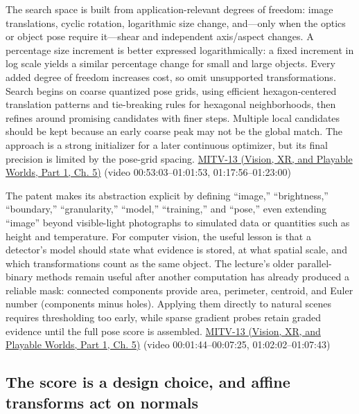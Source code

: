 The search space is built from application-relevant degrees of freedom: image translations, cyclic rotation, logarithmic size change, and---only when the optics or object pose require it---shear and independent axis/aspect changes. A percentage size increment is better expressed logarithmically: a fixed increment in log scale yields a similar percentage change for small and large objects. Every added degree of freedom increases cost, so omit unsupported transformations. Search begins on coarse quantized pose grids, using efficient hexagon-centered translation patterns and tie-breaking rules for hexagonal neighborhoods, then refines around promising candidates with finer steps. Multiple local candidates should be kept because an early coarse peak may not be the global match. The approach is a strong initializer for a later continuous optimizer, but its final precision is limited by the pose-grid spacing. \href{../07-Vision-XR-and-Playable-Worlds-P01/main.pdf\#nameddest=04-visual-computing-ii-ch036-mitv-13---object-detection-recognition-and-pose-determination-patquick-us-7016539}{MITV-13 (Vision, XR, and Playable Worlds, Part 1, Ch. 5)} (video 00:53:03--01:01:53, 01:17:56--01:23:00)

The patent makes its abstraction explicit by defining ``image,'' ``brightness,'' ``boundary,'' ``granularity,'' ``model,'' ``training,'' and ``pose,'' even extending ``image'' beyond visible-light photographs to simulated data or quantities such as height and temperature. For computer vision, the useful lesson is that a detector's model should state what evidence is stored, at what spatial scale, and which transformations count as the same object. The lecture's older parallel-binary methods remain useful after another computation has already produced a reliable mask: connected components provide area, perimeter, centroid, and Euler number (components minus holes). Applying them directly to natural scenes requires thresholding too early, while sparse gradient probes retain graded evidence until the full pose score is assembled. \href{../07-Vision-XR-and-Playable-Worlds-P01/main.pdf\#nameddest=04-visual-computing-ii-ch036-mitv-13---object-detection-recognition-and-pose-determination-patquick-us-7016539}{MITV-13 (Vision, XR, and Playable Worlds, Part 1, Ch. 5)} (video 00:01:44--00:07:25, 01:02:02--01:07:43)

\subsection{The score is a design choice, and affine transforms act on normals}\label{04-visual-computing-ii-ch030-the-score-is-a-design-choice-and-affine-transforms-act-on-normals}

